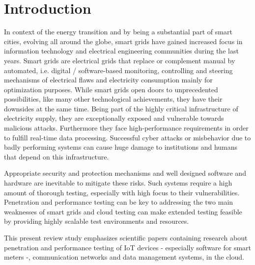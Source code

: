 \section{Introduction}
In context of the energy transition and by being a substantial part of smart cities, evolving all around the globe, smart grids have gained increased focus in information technology and electrical engineering communities during the last years. Smart grids are electrical grids that replace or complement manual by automated, i.e. digital / software-based monitoring, controlling and steering mechanisms of electrical flaws and electricity consumption mainly for optimization purposes. While smart grids open doors to unprecedented possibilities, like many other technological achievements, they have their downsides at the same time. Being part of the highly critical infrastructure of electricity supply, they are exceptionally exposed and vulnerable towards malicious attacks. Furthermore they face high-performance requirements in order to fulfill real-time data processing. Successful cyber attacks or misbehavior due to badly performing systems can cause huge damage to institutions and humans that depend on this infrastructure.

Appropriate security and protection mechanisms and well designed software and hardware are inevitable to mitigate these risks. Such systems require a high amount of thorough testing, especially with high focus to their vulnerabilities. Penetration and performance testing can be key to addressing the two main weaknesses of smart grids and cloud testing can make extended testing feasible by providing highly scalable test environments and resources.

This present review study emphasizes scientific papers containing research about penetration and performance testing of IoT devices - especially software for smart meters -, communication networks and data management systems, in the cloud.
